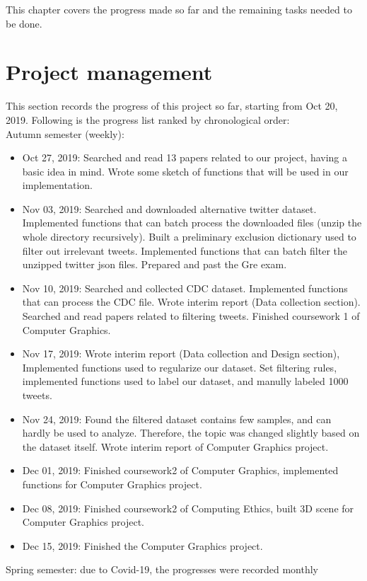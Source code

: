 This chapter covers the progress made so far and the remaining tasks needed to be done.
\section{Project management}
This section records the progress of this project so far, starting from Oct 20, 2019. Following is the progress list ranked by chronological order:\\
Autumn semester (weekly):
\begin{itemize}
    \item Oct 27, 2019: Searched and read 13 papers related to our project, having a basic idea in mind. Wrote some sketch of functions that will be used in our implementation.
    \item Nov 03, 2019: Searched and downloaded alternative twitter dataset. Implemented functions that can batch process the downloaded files (unzip the whole directory recursively). Built a preliminary exclusion dictionary used to filter out irrelevant tweets. Implemented functions that can batch filter the unzipped twitter json files. Prepared and past the Gre exam. 
    \item Nov 10, 2019: Searched and collected CDC dataset. Implemented functions that can process the CDC file. Wrote interim report (Data collection section). Searched and read papers related to filtering tweets. Finished coursework 1 of Computer Graphics.
    \item Nov 17, 2019: Wrote interim report (Data collection and Design section), Implemented functions used to regularize our dataset. Set filtering rules, implemented functions used to label our dataset, and manully labeled 1000 tweets.
    \item Nov 24, 2019: Found the filtered dataset contains few samples, and can hardly be used to analyze. Therefore, the topic was changed slightly based on the dataset itself. Wrote interim report of Computer Graphics project.
    \item Dec 01, 2019: Finished coursework2 of Computer Graphics, implemented functions for Computer Graphics project.
    \item Dec 08, 2019: Finished coursework2 of Computing Ethics, built 3D scene for Computer Graphics project.
    \item Dec 15, 2019: Finished the Computer Graphics project.
\end{itemize} 
Spring semester: due to Covid-19, the progresses were recorded monthly

